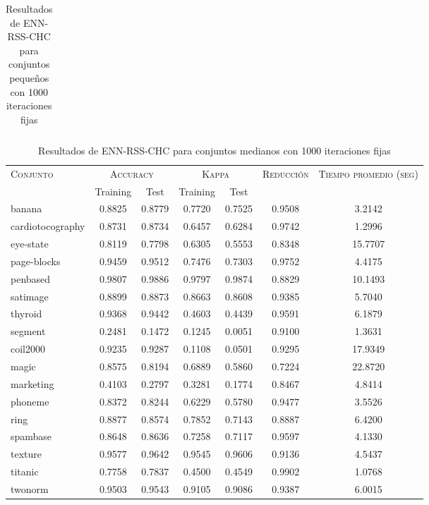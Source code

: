 \begin{table}[]
\begin{tabular}{l c c c c c c}
\hline
\end{tabular}
\caption{Resultados de ENN-RSS-CHC para conjuntos pequeños con 1000 iteraciones fijas}
\label{res-peq-ENN-RSS-CHC}
\end{table}


\begin{table}[]
\centering
\begin{tabular}{l c c c c c c}
\hline
\multirow{2}{*}{\textsc{Conjunto}}
	& \multicolumn{2}{c}{\textsc{Accuracy}}
	& \multicolumn{2}{c}{\textsc{Kappa}}
	& \textsc{Reducción}
	& \textsc{Tiempo promedio (seg)} \\
	& Training & Test
	& Training & Test \\ 
\hline
\hline

banana & 0.8825 & 0.8779 & 0.7720 & 0.7525 & 0.9508 & 3.2142 \\
cardiotocography & 0.8731 & 0.8734 & 0.6457 & 0.6284 & 0.9742 & 1.2996 \\
eye-state & 0.8119 & 0.7798 & 0.6305 & 0.5553 & 0.8348 &  15.7707 \\
page-blocks & 0.9459 & 0.9512 & 0.7476 & 0.7303 & 0.9752 & 4.4175 \\
penbased & 0.9807 & 0.9886 & 0.9797 & 0.9874 & 0.8829 & 10.1493 \\
satimage & 0.8899 & 0.8873 & 0.8663 & 0.8608 & 0.9385 & 5.7040 \\
thyroid & 0.9368 & 0.9442 & 0.4603 & 0.4439 & 0.9591 & 6.1879 \\
segment & 0.2481 & 0.1472 & 0.1245 & 0.0051 & 0.9100 & 1.3631 \\
coil2000 & 0.9235 & 0.9287 & 0.1108 & 0.0501 & 0.9295 &  17.9349 \\
magic & 0.8575 & 0.8194 & 0.6889 & 0.5860 & 0.7224 &  22.8720 \\
marketing & 0.4103 & 0.2797 & 0.3281 & 0.1774 & 0.8467 & 4.8414 \\
phoneme & 0.8372 & 0.8244 & 0.6229 & 0.5780 & 0.9477 & 3.5526 \\
ring & 0.8877 & 0.8574 & 0.7852 & 0.7143 & 0.8887 & 6.4200 \\
spambase & 0.8648 & 0.8636 & 0.7258 & 0.7117 & 0.9597 & 4.1330 \\
texture & 0.9577 & 0.9642 & 0.9545 & 0.9606 & 0.9136 & 4.5437 \\
titanic & 0.7758 & 0.7837 & 0.4500 & 0.4549 & 0.9902 & 1.0768 \\
twonorm & 0.9503 & 0.9543 & 0.9105 & 0.9086 & 0.9387 & 6.0015 \\

\hline
\end{tabular}
\caption{Resultados de ENN-RSS-CHC para conjuntos medianos con 1000 iteraciones fijas}
\label{res-med-ENN-RSS-CHC}
\end{table}



